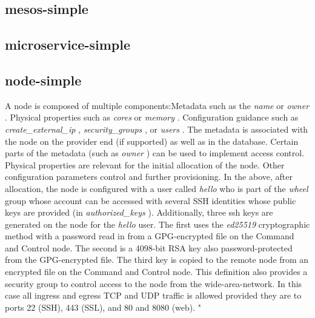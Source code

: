\documentclass[9pt,twocolumn,twoside]{styles/osajnl}
\begin{document}


\subsection{mesos-simple}



\subsection{microservice-simple}



\subsection{node-simple}

A node is composed of multiple components:Metadata such as the
{\em name}  or {\em owner} .  Physical properties such as {\em cores}  or
{\em memory} .  Configuration guidance such as {\em create\_external\_ip} ,
{\em security\_groups} , or {\em users} . The metadata is associated with the
node on the provider end (if supported) as well as in the database.
Certain parts of the metadata (such as {\em owner} ) can be used to
implement access control.  Physical properties are relevant for the
initial allocation of the node.  Other configuration parameters
control and further provisioning.  In the above, after allocation, the
node is configured with a user called {\em hello}  who is part of the
{\em wheel}  group whose account can be accessed with several SSH
identities whose public keys are provided (in
{\em authorized\_keys} ). Additionally, three ssh keys are generated on
the node for the {\em hello}  user.  The first uses the {\em
      ed25519}    
cryptographic method with a password read in from a GPG-encrypted file
on the Command and Control node.  The second is a 4098-bit RSA key
also password-protected from the GPG-encrypted file.  The third key is
copied to the remote node from an encrypted file on the Command and
Control node.  This definition also provides a security group to
control access to the node from the wide-area-network.  In this case
all ingress and egress TCP and UDP traffic is allowed provided they
are to ports 22 (SSH), 443 (SSL), and 80 and 8080 (web). "
\end{document}
